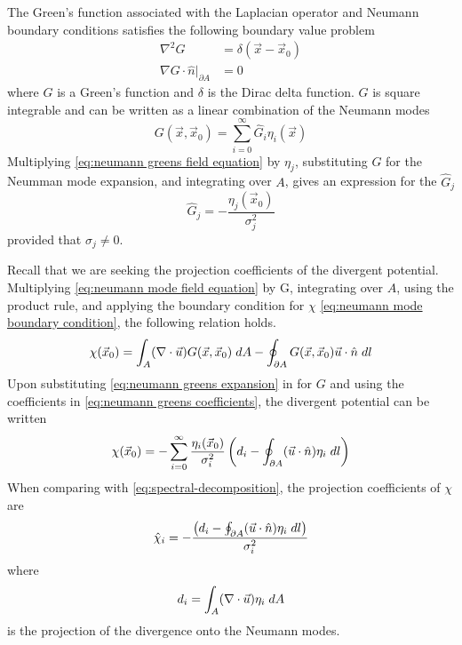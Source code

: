 \documentclass[draft]{agujournal2019}
\begin{document}
The Green's function associated with the Laplacian operator and Neumann boundary conditions satisfies the following boundary value problem
\begin{subequations}
    \begin{align}
        \nabla^2 G &= \delta(\vec{x}-\vec{x}_0)  \label{eq:neumann greens field equation} \\
        \nabla G \cdot \hat{n}|_{\partial A} &= 0 \label{eq:neumann greens boundary condition}
    \end{align}
\end{subequations}
where $G$ is a Green's function and $\delta$ is the Dirac delta function. $G$ is square integrable and can be written as a linear combination of the Neumann modes
\begin{equation}
    G(\vec{x},\vec{x}_0) = \sum_{i=0} ^\infty \hat{G}_i \eta_i(\vec{x}) \label{eq:neumann greens expansion}
\end{equation}
Multiplying \eqref{eq:neumann greens field equation} by $\eta_j$, substituting $G$ for the Neumman mode expansion, and integrating over $A$, gives an expression for the $\hat{G}_j$
\begin{equation}
    \hat{G}_j = -\frac{\eta_j(\vec{x}_0)}{\sigma_j^2} \label{eq:neumann greens coefficients}
\end{equation}
provided that $\sigma_j \neq 0$.

Recall that we are seeking the projection coefficients of the divergent potential. Multiplying \eqref{eq:neumann mode field equation} by G, integrating over $A$, using the product rule, and applying the boundary condition for $\chi$ \eqref{eq:neumann mode boundary condition}, the following relation holds.
\begin{equation}
    \chi(\vec{x}_0) = \int_A (\nabla \cdot \vec{u}) G(\vec{x},\vec{x}_0) \hspace{1mm} dA -  \oint_{\partial A} G(\vec{x},\vec{x}_0) \vec{u} \cdot \hat{n} \hspace{1mm} dl
\end{equation}
Upon substituting \eqref{eq:neumann greens expansion} in for $G$ and using the coefficients in \eqref{eq:neumann greens coefficients}, the divergent potential can be written
\begin{equation}
    \chi(\vec{x}_0) = -\sum_{i=0}^\infty \frac{\eta_i(\vec{x}_0)}{\sigma_i^2}\left( d_i - \oint_{\partial A} (\vec{u} \cdot \hat{n} )\eta_i \hspace{1mm} dl \right)
\end{equation}
When comparing with \eqref{eq:spectral-decomposition}, the projection coefficients of $\chi$ are
\begin{equation}
    \hat{\chi}_i = -\frac{\left( d_i - \oint_{\partial A} (\vec{u} \cdot \hat{n} )\eta_i \hspace{1mm} dl \right)}{\sigma_i^2} \label{eq:divergent-modal-coefficients}
\end{equation}
where 
\begin{equation}
    d_i = \int_A (\nabla \cdot \vec{u}) \eta_i \hspace{1mm}dA
\end{equation}
is the projection of the divergence onto the Neumann modes.
\end{document}
